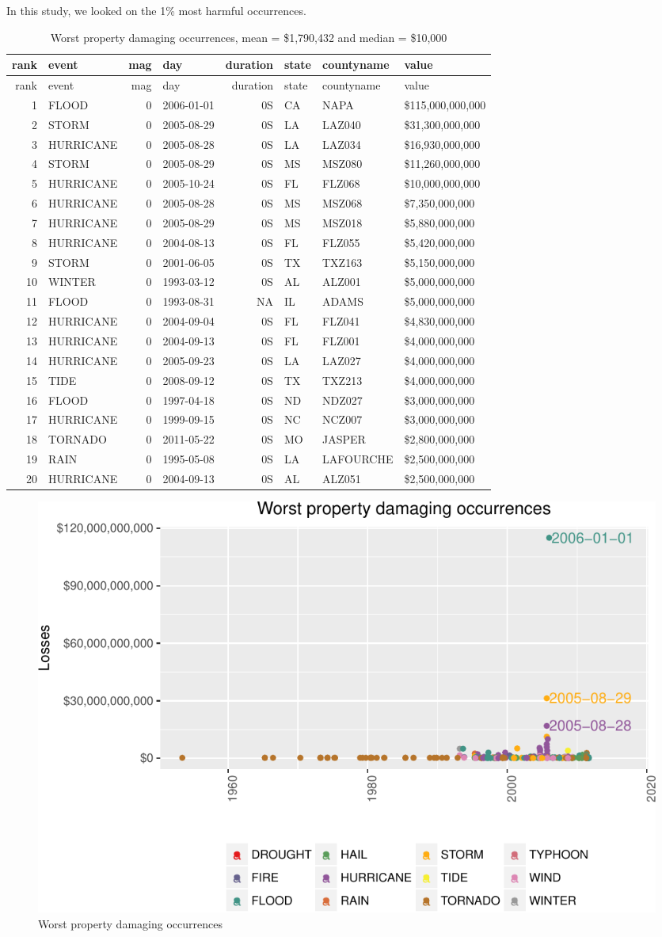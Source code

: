 \documentclass[]{article}
\begin{document}
In this study, we looked on the 1\% most harmful occurrences.

\begin{longtable}[]{@{}rlrlrlll@{}}
\caption{Worst property damaging occurrences, mean = \$1,790,432 and
median = \$10,000}\tabularnewline
\toprule
rank & event & mag & day & duration & state & countyname &
value\tabularnewline
\midrule
\endfirsthead
\toprule
rank & event & mag & day & duration & state & countyname &
value\tabularnewline
\midrule
\endhead
1 & FLOOD & 0 & 2006-01-01 & 0S & CA & NAPA &
\$115,000,000,000\tabularnewline
2 & STORM & 0 & 2005-08-29 & 0S & LA & LAZ040 &
\$31,300,000,000\tabularnewline
3 & HURRICANE & 0 & 2005-08-28 & 0S & LA & LAZ034 &
\$16,930,000,000\tabularnewline
4 & STORM & 0 & 2005-08-29 & 0S & MS & MSZ080 &
\$11,260,000,000\tabularnewline
5 & HURRICANE & 0 & 2005-10-24 & 0S & FL & FLZ068 &
\$10,000,000,000\tabularnewline
6 & HURRICANE & 0 & 2005-08-28 & 0S & MS & MSZ068 &
\$7,350,000,000\tabularnewline
7 & HURRICANE & 0 & 2005-08-29 & 0S & MS & MSZ018 &
\$5,880,000,000\tabularnewline
8 & HURRICANE & 0 & 2004-08-13 & 0S & FL & FLZ055 &
\$5,420,000,000\tabularnewline
9 & STORM & 0 & 2001-06-05 & 0S & TX & TXZ163 &
\$5,150,000,000\tabularnewline
10 & WINTER & 0 & 1993-03-12 & 0S & AL & ALZ001 &
\$5,000,000,000\tabularnewline
11 & FLOOD & 0 & 1993-08-31 & NA & IL & ADAMS &
\$5,000,000,000\tabularnewline
12 & HURRICANE & 0 & 2004-09-04 & 0S & FL & FLZ041 &
\$4,830,000,000\tabularnewline
13 & HURRICANE & 0 & 2004-09-13 & 0S & FL & FLZ001 &
\$4,000,000,000\tabularnewline
14 & HURRICANE & 0 & 2005-09-23 & 0S & LA & LAZ027 &
\$4,000,000,000\tabularnewline
15 & TIDE & 0 & 2008-09-12 & 0S & TX & TXZ213 &
\$4,000,000,000\tabularnewline
16 & FLOOD & 0 & 1997-04-18 & 0S & ND & NDZ027 &
\$3,000,000,000\tabularnewline
17 & HURRICANE & 0 & 1999-09-15 & 0S & NC & NCZ007 &
\$3,000,000,000\tabularnewline
18 & TORNADO & 0 & 2011-05-22 & 0S & MO & JASPER &
\$2,800,000,000\tabularnewline
19 & RAIN & 0 & 1995-05-08 & 0S & LA & LAFOURCHE &
\$2,500,000,000\tabularnewline
20 & HURRICANE & 0 & 2004-09-13 & 0S & AL & ALZ051 &
\$2,500,000,000\tabularnewline
\bottomrule
\end{longtable}

\begin{figure}[htbp]
\centering
\includegraphics{readme_files/figure-latex/prop-single-plot-1.pdf}
\caption{Worst property damaging occurrences}
\end{figure}
\end{document}
